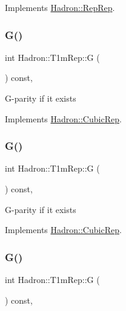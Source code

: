 Implements \mbox{\hyperlink{structHadron_1_1RepRep_a92c8802e5ed7afd7da43ccfd5b7cd92b}{Hadron\+::\+Rep\+Rep}}.

\mbox{\label{structHadron_1_1T1mRep_a4312f3d70845d6606406384a84d2bf14}} 
\subsubsection{\texorpdfstring{G()}{G()}\hspace{0.1cm}{\footnotesize\ttfamily [1/3]}}
{\footnotesize\ttfamily int Hadron\+::\+T1m\+Rep\+::G (\begin{DoxyParamCaption}{ }\end{DoxyParamCaption}) const\hspace{0.3cm}{\ttfamily [inline]}, {\ttfamily [virtual]}}

G-\/parity if it exists 

Implements \mbox{\hyperlink{structHadron_1_1CubicRep_a52104e43266d1614c00bbd1c3b395458}{Hadron\+::\+Cubic\+Rep}}.

\mbox{\label{structHadron_1_1T1mRep_a4312f3d70845d6606406384a84d2bf14}} 
\subsubsection{\texorpdfstring{G()}{G()}\hspace{0.1cm}{\footnotesize\ttfamily [2/3]}}
{\footnotesize\ttfamily int Hadron\+::\+T1m\+Rep\+::G (\begin{DoxyParamCaption}{ }\end{DoxyParamCaption}) const\hspace{0.3cm}{\ttfamily [inline]}, {\ttfamily [virtual]}}

G-\/parity if it exists 

Implements \mbox{\hyperlink{structHadron_1_1CubicRep_a52104e43266d1614c00bbd1c3b395458}{Hadron\+::\+Cubic\+Rep}}.

\mbox{\label{structHadron_1_1T1mRep_a4312f3d70845d6606406384a84d2bf14}} 
\subsubsection{\texorpdfstring{G()}{G()}\hspace{0.1cm}{\footnotesize\ttfamily [3/3]}}
{\footnotesize\ttfamily int Hadron\+::\+T1m\+Rep\+::G (\begin{DoxyParamCaption}{ }\end{DoxyParamCaption}) const\hspace{0.3cm}{\ttfamily [inline]}, {\ttfamily [virtual]}}

